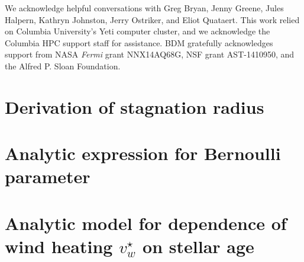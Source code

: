 \documentclass[usenatbib,fleqn]{mn2e}
\newcommand{\vwO}{v_{w}}
\begin{document}
We acknowledge helpful conversations with Greg Bryan, Jenny Greene, Jules Halpern,
Kathryn Johnston, Jerry Ostriker, and Eliot Quataert.  This work
relied on Columbia University's Yeti computer cluster, and we
acknowledge the Columbia HPC support staff for assistance.  BDM
gratefully acknowledges support from NASA {\it Fermi} grant
NNX14AQ68G, NSF grant AST-1410950, and the Alfred P. Sloan Foundation.


  \clearpage
  \appendix
  \section{Derivation of stagnation radius}
  \label{app:rs}
  

  \section{Analytic expression for Bernoulli parameter}
  \label{app:be}
  

  \section{Analytic model for dependence of wind heating $\vwO^{\star}$ on stellar age}
\label{app:windheat}


  \footnotesize{
    
    
  }
\end{document}
